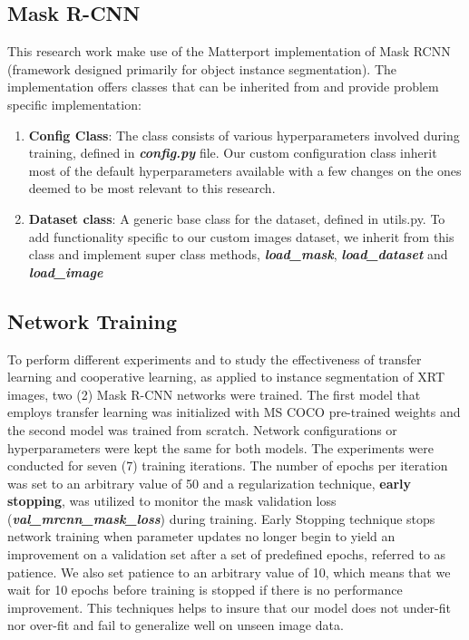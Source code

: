 \documentclass[conference]{IEEEtran}
\begin{document}
	\subsection{Mask R-CNN}
		
		This research work make use of the Matterport implementation of Mask RCNN (framework
designed primarily for object instance segmentation). The implementation offers classes
that can be inherited from and provide problem specific implementation:
		
		\begin{enumerate}
			\item \textbf{Config Class}: The class consists of various hyperparameters involved during training, defined in \textbf{\textit{config.py}} file. Our custom configuration class inherit most of the default hyperparameters available with a few changes on the ones deemed to be most relevant to this research.
			
			\item \textbf{Dataset class}: A generic base class for the dataset, defined in utils.py. To add functionality specific to our custom images dataset, we inherit from this class and implement
			super class methods, \textbf{\textit{load\_mask}}, \textbf{\textit{load\_dataset}} and \textbf{\textit{load\_image}}
		\end{enumerate}
	
	\subsection{Network Training}
		
		To perform different experiments and to study the effectiveness of transfer	learning and cooperative learning, as applied to instance segmentation of XRT images, two (2) Mask R-CNN networks were trained. The first model that employs transfer learning
was initialized with MS COCO pre-trained weights and the second model was trained from scratch. Network configurations or hyperparameters were kept the same for both models.	The experiments were conducted for seven (7) training iterations. The number of epochs per
iteration was set to an arbitrary value of 50 and a regularization technique, \textbf{early stopping},
was utilized to monitor the mask validation loss (\textbf{\textit{val\_mrcnn\_mask\_loss}}) during training.
Early Stopping technique stops network training when parameter updates no longer begin
to yield an improvement on a validation set after a set of predefined epochs, referred to as
patience. We also set patience to an arbitrary value of 10, which means that we wait for 10
epochs before training is stopped if there is no performance improvement. This techniques
helps to insure that our model does not under-fit nor over-fit and fail to generalize well on
unseen image data.
\\
		
\end{document}
